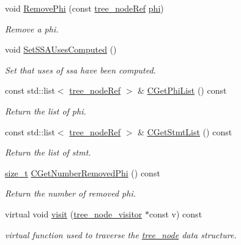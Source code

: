 \begin{DoxyCompactItemize}
void \hyperlink{structbloc_a4ab8511befd9fc1846b99c4bc980c716}{Remove\+Phi} (const \hyperlink{tree__node_8hpp_a6ee377554d1c4871ad66a337eaa67fd5}{tree\+\_\+node\+Ref} \hyperlink{cdfc__module__binding_8hpp_aeea0bcf1696c7f3fa2891f0a8e106706acc026b1a09b99cfe9d1eefb44256d4ec}{phi})
\begin{DoxyCompactList}\small\item\em Remove a phi. \end{DoxyCompactList}\item 
void \hyperlink{structbloc_ad0095b4227078a8b5709cb80a1f2d2db}{Set\+S\+S\+A\+Uses\+Computed} ()
\begin{DoxyCompactList}\small\item\em Set that uses of ssa have been computed. \end{DoxyCompactList}\item 
const std\+::list$<$ \hyperlink{tree__node_8hpp_a6ee377554d1c4871ad66a337eaa67fd5}{tree\+\_\+node\+Ref} $>$ \& \hyperlink{structbloc_aad212d08adb1634e15b4c0bcb31392b2}{C\+Get\+Phi\+List} () const
\begin{DoxyCompactList}\small\item\em Return the list of phi. \end{DoxyCompactList}\item 
const std\+::list$<$ \hyperlink{tree__node_8hpp_a6ee377554d1c4871ad66a337eaa67fd5}{tree\+\_\+node\+Ref} $>$ \& \hyperlink{structbloc_a05e3972caa7a3fbfe64eac935c376930}{C\+Get\+Stmt\+List} () const
\begin{DoxyCompactList}\small\item\em Return the list of stmt. \end{DoxyCompactList}\item 
\hyperlink{tutorial__fpt__2017_2intro_2sixth_2test_8c_a7c94ea6f8948649f8d181ae55911eeaf}{size\+\_\+t} \hyperlink{structbloc_a2e3a87383a8f5cb319bfaaa11fcfefd7}{C\+Get\+Number\+Removed\+Phi} () const
\begin{DoxyCompactList}\small\item\em Return the number of removed phi. \end{DoxyCompactList}\item 
virtual void \hyperlink{structbloc_a59781838b81594687d263f79899f54bc}{visit} (\hyperlink{classtree__node__visitor}{tree\+\_\+node\+\_\+visitor} $\ast$const v) const
\begin{DoxyCompactList}\small\item\em virtual function used to traverse the \hyperlink{classtree__node}{tree\+\_\+node} data structure. \end{DoxyCompactList}\end{DoxyCompactItemize}
